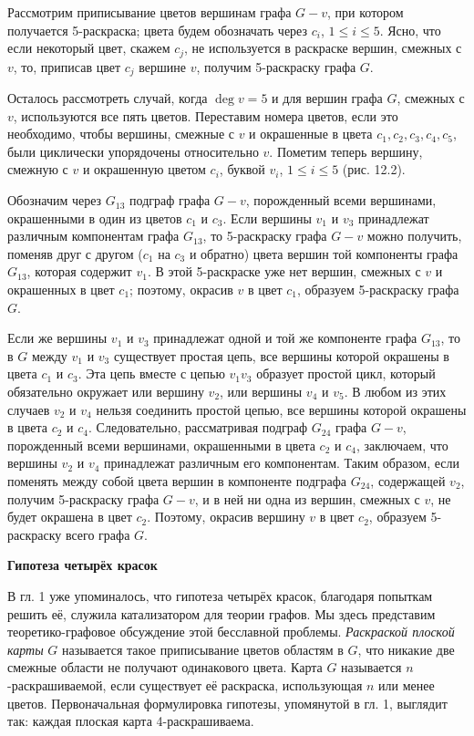 Рассмотрим приписывание цветов вершинам графа $G - v$, при котором получается 5-раскраска; цвета будем обозначать через $c_i$, $1 \leq i \leq 5$. Ясно, что если некоторый цвет, скажем $c_j$, не используется в раскраске вершин, смежных с $v$, то, приписав цвет $c_j$ вершине $v$, получим 5-раскраску графа $G$.

Осталось рассмотреть случай, когда \(\deg v = 5\) и для вершин графа \(G\), смежных с \(v\), используются все пять цветов. Переставим номера цветов, если это необходимо, чтобы вершины, смежные с \(v\) и окрашенные в цвета \(c_1, c_2, c_3, c_4, c_5\), были циклически упорядочены относительно \(v\). Пометим теперь вершину, смежную с \(v\) и окрашенную цветом \(c_i\), буквой \(v_i\), \(1 \leq i \leq 5\) (рис. 12.2).

Обозначим через \(G_{13}\) подграф графа \(G - v\), порожденный всеми вершинами, окрашенными в один из цветов \(c_1\) и \(c_3\). Если вершины \(v_1\) и \(v_3\) принадлежат различным компонентам графа \(G_{13}\), то 5-раскраску графа \(G - v\) можно получить, поменяв друг с другом ($c_1$ на $c_3$ и обратно) цвета вершин той компоненты графа \(G_{13}\), которая содержит \(v_1\). В этой 5-раскраске уже нет вершин, смежных с \(v\) и окрашенных в цвет \(c_1\); поэтому, окрасив \(v\) в цвет \(c_1\), образуем 5-раскраску графа \(G\).

Если же вершины \(v_1\) и \(v_3\) принадлежат одной и той же компоненте графа \(G_{13}\), то в \(G\) между \(v_1\) и \(v_3\) существует простая цепь, все вершины которой окрашены в цвета \(c_1\) и \(c_3\). Эта цепь вместе с цепью \(v_1 v_3\) образует простой цикл, который обязательно окружает или вершину \(v_2\), или вершины \(v_4\) и \(v_5\). В любом из этих случаев \(v_2\) и \(v_4\) нельзя соединить простой цепью, все вершины которой окрашены в цвета \(c_2\) и \(c_4\). Следовательно, рассматривая подграф \(G_{24}\) графа \(G - v\), порожденный всеми вершинами, окрашенными в цвета \(c_2\) и \(c_4\), заключаем, что вершины \(v_2\) и \(v_4\) принадлежат различным его компонентам. Таким образом, если поменять между собой цвета вершин в компоненте подграфа \(G_{24}\), содержащей \(v_2\), получим 5-раскраску графа \(G - v\), и в ней ни одна из вершин, смежных с \(v\), не будет окрашена в цвет \(c_2\). Поэтому, окрасив вершину \(v\) в цвет \(c_2\), образуем 5-раскраску всего графа \(G\).

\textbf{Гипотеза четырёх красок}

В гл. 1 уже упоминалось, что гипотеза четырёх красок, благодаря попыткам решить её, служила катализатором для теории графов. Мы здесь представим теоретико-графовое обсуждение этой бесславной проблемы. \textit{Раскраской плоской карты} $G$ называется такое приписывание цветов областям в $G$, что никакие две смежные области не получают одинакового цвета. Карта $G$ называется $n$-раскрашиваемой, если существует её раскраска, использующая $n$ или менее цветов. Первоначальная формулировка гипотезы, упомянутой в гл. 1, выглядит так: каждая плоская карта 4-раскрашиваема.

